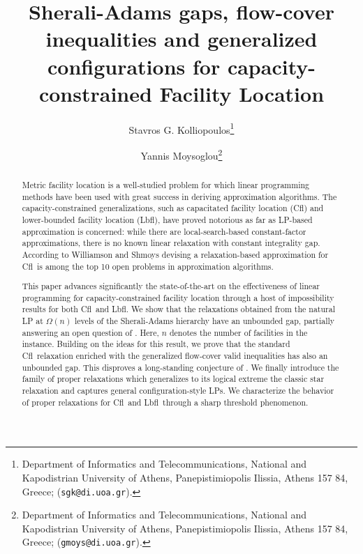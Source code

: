 \documentclass[11pt]{article}
\date{}
\newcommand{\lbfl}{{\sc Lbfl}}
\newcommand{\cfl}{{\sc Cfl}}
\begin{document}
\title{
Sherali-Adams gaps, flow-cover inequalities and generalized configurations for
 capacity-constrained Facility Location 
}

\author{Stavros G. Kolliopoulos\thanks{Department of Informatics and
Telecommunications, National and Kapodistrian 
University of Athens, Panepistimiopolis Ilissia, Athens
157 84, Greece; (\texttt{sgk@di.uoa.gr}).}   
\and Yannis Moysoglou\thanks{ 
Department of Informatics and
Telecommunications, National and Kapodistrian 
University of Athens, Panepistimiopolis Ilissia, Athens
157 84, Greece; (\texttt{gmoys@di.uoa.gr}). } }


\maketitle

\begin{abstract}
Metric facility  location is a  well-studied problem for  which linear
programming  methods have  been used  with great  success  in deriving
approximation  algorithms.  The capacity-constrained  generalizations,
such  as  capacitated  facility  location (\cfl\/)  and  lower-bounded
facility location  (\lbfl), have proved  notorious as far  as LP-based
approximation  is  concerned:   while  there  are  local-search-based
constant-factor  approximations, there  is no known  linear relaxation
with  constant  integrality gap.  According  to    Williamson and Shmoys 
devising a  relaxation-based approximation for \cfl\ is  among the top
10 open problems in approximation algorithms.

This paper  advances significantly the  state-of-the-art 
on  the effectiveness of
linear programming for capacity-constrained facility location
through  a host of impossibility 
results   
for  both \cfl\  and  \lbfl.   We show  that  the  relaxations
obtained   from  the  natural   LP  at   $\Omega(n)$  levels   of  the
Sherali-Adams  hierarchy  have an  unbounded  gap,  partially 
answering an  open
question of  \cite{LiS13, AnBS13}. Here, $n$ denotes the  number of facilities
in the instance.  Building on the ideas for this result, we prove that
the standard \cfl\ relaxation enriched with the generalized flow-cover
valid inequalities  \cite{AardalPW95} has  also an unbounded  gap.  
This disproves a long-standing conjecture of \cite{LeviSS12}. 
We
finally introduce  the family of proper  relaxations which generalizes
to  its  logical extreme  the  classic  star  relaxation and  captures
general  configuration-style  LPs.  We  characterize  the behavior  of
proper  relaxations for  \cfl\ and  \lbfl\ through  a  sharp threshold
phenomenon.


\end{abstract}
\end{document}
